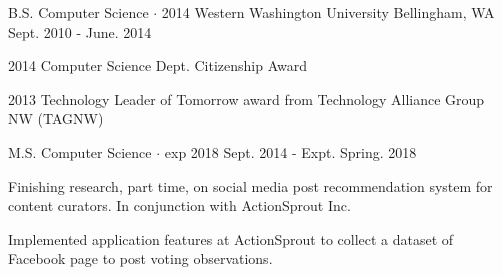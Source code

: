 \documentclass[11pt, a4paper]{awesome-cv}
\begin{document}
\begin{cventries}
  \cventry
  {B.S. Computer Science $\cdot$ 2014} %
  {Western Washington University} %
  {Bellingham, WA} %
  {Sept. 2010 - June. 2014} %
  {
  \begin{cvitems} %
    \item {2014 Computer Science Dept. Citizenship Award}
    \item {2013 Technology Leader of Tomorrow award from Technology Alliance Group NW (TAGNW)}
  \end{cvitems}
  }
  {}

  \cventry
  {M.S. Computer Science $\cdot$ exp 2018} %
  { } %
  { } %
  {Sept. 2014 - Expt. Spring. 2018} %
  {
  \begin{cvitems} %
    \item {Finishing research, part time, on social media post recommendation system for content curators. In conjunction with ActionSprout Inc.}
    \item {Implemented application features at ActionSprout to collect a dataset of Facebook page to post voting observations.}
  \end{cvitems}
  }
  {}

\end{cventries}
\end{document}
